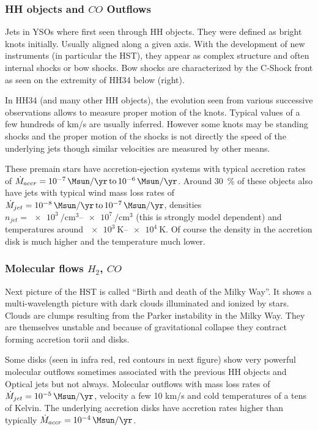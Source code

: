 \documentclass[10pt,a4paper,english]{article}
\newcommand\SIrangeto[2]{\SIrange[range-phrase=\,\text{to}\,]{#1}{#2}}
\begin{document}
\subsubsection{\texorpdfstring{HH objects and $CO$ Outflows}{HH objects and CO Outflows}}

Jets in YSOs where first seen through HH objects. They were defined as bright
knots initially. Usually aligned along a given axis. With the development of
new instruments (in particular the HST), they appear as complex structure and
often internal shocks or bow shocks. Bow shocks are characterized by the
C-Shock front as seen on the extremity of HH34 below (right).

In HH34 (and many other HH objects), the evolution seen from various successive
observations allows to measure proper motion of the knots. Typical values of a
few hundreds of km/s are usually inferred. However some knots may be standing
shocks and the proper motion of the shocks is not directly the speed of the
underlying jets though similar velocities are measured by other means.

These premain stars have accretion-ejection systems with typical accretion
rates of $\dot{M}_{accr}=\SIrangeto{e-7}{e-6}{\Msun\per\yr}$. Around
\SI{30}{\percent} of these objects also have jets with typical wind mass loss
rates of $\dot{M}_{jet}=\SIrangeto{e-8}{e-7}{\Msun\per\yr}$, densities
$n_{jet}=\SIrangeto{e3}{e7}{\per\cubic\cm}$ (this is strongly model dependent)
and temperatures around $\SIrangeto{e3}{e4}{\kelvin}$. Of course the density in
the accretion disk is much higher and the temperature much lower.

\subsubsection{\texorpdfstring{Molecular flows $H_2$, $CO$}{Molecular flows H2, CO}}

Next picture of the HST is called “Birth and death of the Milky Way”. It shows
a multi-wavelength picture with dark clouds illuminated and ionized by stars.
Clouds are clumps resulting from the Parker instability in the Milky Way. They
are themselves unstable and because of gravitational collapse they contract
forming accretion torii and disks.

Some disks (seen in infra red, red contours in next figure) show very powerful
molecular outflows sometimes associated with the previous HH objects and
Optical jets but not always. Molecular outflows with mass loss rates of
$\dot{M}_{jet}=\SI{e-5}{\Msun\per\yr}$, velocity a few 10 km/s and cold
temperatures of a tens of Kelvin. The underlying accretion disks have accretion
rates higher than typically $\dot{M}_{accr}=\SI{e-4}{\Msun\per\yr}$.
\end{document}
